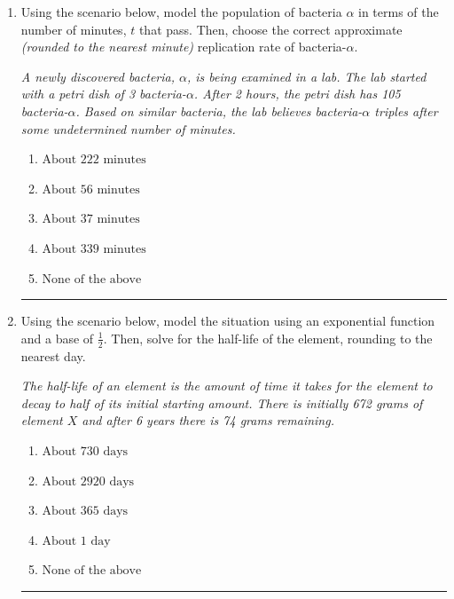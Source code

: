 \documentclass[14pt]{extbook}
\newcommand{\litem}[1]{\item#1\hspace*{-1cm}\rule{\textwidth}{0.4pt}}
\begin{document}
\begin{enumerate}
{\begin{enumerate}[label=\Alph*.]
\end{enumerate} }
\litem{
Using the scenario below, model the population of bacteria $\alpha$ in terms of the number of minutes, $t$ that pass. Then, choose the correct approximate \textit{(rounded to the nearest minute)} replication rate of bacteria-$\alpha$.
\begin{center}
    \textit{ A newly discovered bacteria, $\alpha$, is being examined in a lab. The lab started with a petri dish of 3 bacteria-$\alpha$. After 2 hours, the petri dish has 105 bacteria-$\alpha$. Based on similar bacteria, the lab believes bacteria-$\alpha$ triples after some undetermined number of minutes. }
\end{center}
\begin{enumerate}[label=\Alph*.]
\item \( \text{About } 222 \text{ minutes} \)
\item \( \text{About } 56 \text{ minutes} \)
\item \( \text{About } 37 \text{ minutes} \)
\item \( \text{About } 339 \text{ minutes} \)
\item \( \text{None of the above} \)

\end{enumerate} }
\litem{
Using the scenario below, model the situation using an exponential function and a base of $\frac{1}{2}$. Then, solve for the half-life of the element, rounding to the nearest day.
\begin{center}
    \textit{ The half-life of an element is the amount of time it takes for the element to decay to half of its initial starting amount. There is initially 672 grams of element $X$ and after 6 years there is 74 grams remaining. }
\end{center}
\begin{enumerate}[label=\Alph*.]
\item \( \text{About } 730 \text{ days} \)
\item \( \text{About } 2920 \text{ days} \)
\item \( \text{About } 365 \text{ days} \)
\item \( \text{About } 1 \text{ day} \)
\item \( \text{None of the above} \)


\end{enumerate}}
\end{enumerate}
\end{document}

